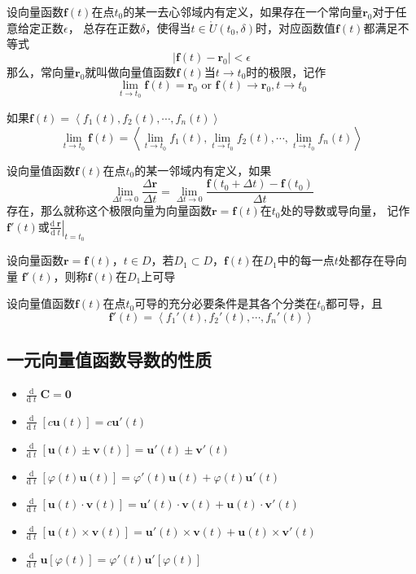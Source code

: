 \documentclass[UTF8]{ctexart}
\newcommand{\dif}[1]{{\text{d}\;\!#1}}
\newcommand{\dev}[1]{{\frac{\text{d}}{\dif{#1}}\;\!}}
\newcommand{\ve}[1]{{\bm{#1}}}
\newcommand{\when}[2]{{\left.{#1}\right|_{#2}}}
\begin{document}
\bigskip

设向量函数$\ve{f}(t)$在点$t_0$的某一去心邻域内有定义，如果存在一个常向量$\ve{r}_0$对于任意给定正数$\epsilon$，
总存在正数$\delta$，使得当$t\in\mathring{U}(t_0,\delta)$时，对应函数值$\ve{f}(t)$都满足不等式
\[|\ve{f}(t)-\ve{r}_0|<\epsilon\]
那么，常向量$\ve{r}_0$就叫做向量值函数$\ve{f}(t)$当$t\to t_0$时的极限，记作
\[\lim_{t\to t_0}\ve{f}(t)=\ve{r}_0\text{ or }\ve{f}(t)\to\ve{r}_0,t\to t_0\]

\bigskip

如果$\ve{f}(t)=\left\langle f_1(t),f_2(t),\cdots,f_n(t) \right\rangle$
\[\lim_{t\to t_0}\ve{f}(t)=\left\langle \lim_{t\to t_0}f_1(t),\lim_{t\to t_0}f_2(t),\cdots,\lim_{t\to t_0}f_n(t) \right\rangle\]

\bigskip

设向量值函数$\ve{f}(t)$在点$t_0$的某一邻域内有定义，如果
\[ \lim_{\Delta t\to0}\frac{\Delta \ve{r}}{\Delta t}=\lim_{\Delta t\to0}\frac{\ve{f}(t_0+\Delta t)-\ve{f}(t_0)}{\Delta t} \]
存在，那么就称这个极限向量为向量函数$\ve{r}=\ve{f}(t)$在$t_0$处的导数或导向量，
记作$\ve{f'}(t)$或$\when{\frac{\dif{\ve{r}}}{\dif{t}}}{t=t_0}$

设向量函数$\ve{r}=\ve{f}(t)$，$t\in D$，若$D_1\subset D$，$\ve{f}(t)$在$D_1$中的每一点$t$处都存在导向量
$\ve{f'}(t)$，则称$\ve{f}(t)$在$D_1$上可导

\bigskip

设向量值函数$\ve{f}(t)$在点$t_0$可导的充分必要条件是其各个分类在$t_0$都可导，且
\[ \ve{f'}(t)=\left\langle f_1'(t),f_2'(t),\cdots,f_n'(t) \right\rangle \]

\subsection*{一元向量值函数导数的性质}

\begin{itemize}
  \item $\displaystyle\dev{t}\ve{C}=\ve{0}$
  \item $\displaystyle\dev{t}[c\ve{u}(t)]=c\ve{u'}(t)$
  \item $\displaystyle\dev{t}[\ve{u}(t)\pm\ve{v}(t)]=\ve{u'}(t)\pm\ve{v'}(t)$
  \item $\displaystyle\dev{t}[\varphi(t)\ve{u}(t)]=\varphi'(t)\ve{u}(t)+\varphi(t)\ve{u'}(t)$
  \item $\displaystyle\dev{t}[\ve{u}(t)\cdot\ve{v}(t)]=\ve{u'}(t)\cdot\ve{v}(t)+\ve{u}(t)\cdot\ve{v'}(t)$
  \item $\displaystyle\dev{t}[\ve{u}(t)\times\ve{v}(t)]=\ve{u'}(t)\times\ve{v}(t)+\ve{u}(t)\times\ve{v'}(t)$
  \item $\displaystyle\dev{t}\ve{u}[\varphi(t)]=\varphi'(t)\ve{u'}[\varphi(t)]$
\end{itemize}
\end{document}
